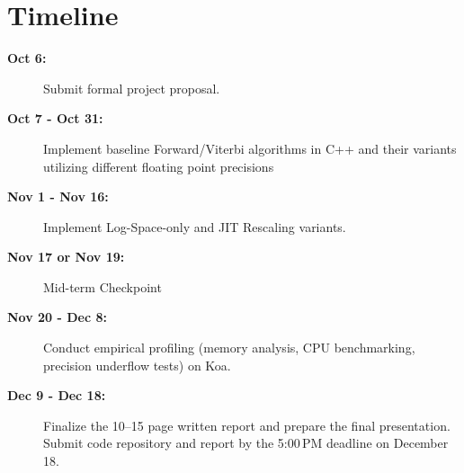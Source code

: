 \documentclass{article}
\begin{document}
\section{Timeline}
\begin{description}
    \item[\textbf{Oct 6:}] Submit formal project proposal.
    \item[\textbf{Oct 7 - Oct 31:}] Implement baseline Forward/Viterbi algorithms in C++ and their variants utilizing different floating point precisions
    \item[\textbf{Nov 1 - Nov 16:}] Implement Log-Space-only and JIT Rescaling variants.
    \item[\textbf{Nov 17 or Nov 19:}] Mid-term Checkpoint
    \item[\textbf{Nov 20 - Dec 8:}] Conduct empirical profiling (memory analysis, CPU benchmarking, precision underflow tests) on Koa.
    \item[\textbf{Dec 9 - Dec 18:}] Finalize the 10--15 page written report and prepare the final presentation. Submit code repository and report by the 5:00\,PM deadline on December 18.
\end{description}

\printbibliography
\end{document}
